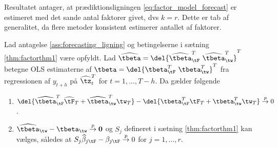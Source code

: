 Resultatet antager, at prædiktionsligningen \eqref{eq:factor_model_forecast} er estimeret med det sande antal faktorer givet, dvs \(k=r\).
Dette er tab af generalitet, da flere metoder konsistent estimerer antallet af faktorer.
%
\begin{thm} \label{thm:factorthm2}
Lad antagelse \ref{ass:forecasting_ligning} og betingelserne i sætning \ref{thm:factorthm1} være opfyldt. 
Lad \(\widehat{\tbeta} =\del{
\widehat{\tbeta}_{\tF}^T \ \widehat{\tbeta}_{\tw}^T}^T\) betegne OLS estimaterne af  \(\tbeta =\del{
\tbeta_{\tF}^T \ \tbeta_{\tw}^T}^T\) fra regressionen af \(y_{t+h}\) på \(\widehat{\tz}_t^T\) for \(t=1, \ldots, T-h\).
Da gælder følgende
\begin{enumerate}[label=\alph*)]
\item \(\del{\widehat{\tbeta}_{\tF}^T \widehat{\tF}_T + \widehat{\tbeta}^T_{\tw} \tw_T} - \del{\tbeta_{\tF}^T \tF_T + \tbeta_{\tw}^T \tw_T} \overset{p}{\rightarrow} 0\).
\item \(\widehat{\tbeta}_{\tw} - \tbeta_{\tw} \overset{p}{\rightarrow} \mathbf{0}\) og \(S_j\) defineret i sætning \ref{thm:factorthm1} kan vælges, således at \(S_j \widehat{\beta}_{j \tF} - \beta_{j \tF} \overset{p}{\rightarrow} 0\) for \(j = 1, \ldots, r\).
\end{enumerate}
\end{thm}
%
